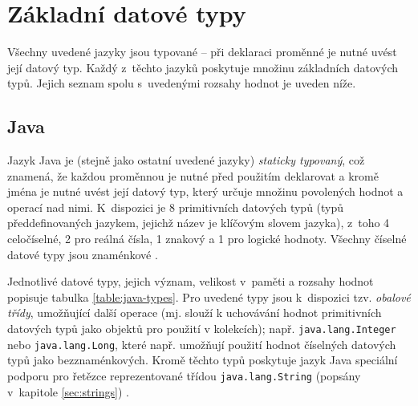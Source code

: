 \documentclass[onepage, a4paper, 12pt]{bakalarka}
\begin{document}
\section{Základní datové typy}
Všechny uvedené jazyky jsou typované -- při deklaraci proměnné je nutné uvést její datový typ. Každý z~těchto jazyků poskytuje množinu základních datových typů. Jejich seznam spolu s~uvedenými rozsahy hodnot je uveden níže.

\subsection{Java}
Jazyk Java je (stejně jako ostatní uvedené jazyky) \textit{staticky typovaný}, což znamená, že každou proměnnou je nutné před použitím deklarovat a kromě jména je nutné uvést její datový typ, který určuje množinu povolených hodnot a operací nad nimi. K~dispozici je 8 primitivních datových typů (typů předdefinovaných jazykem, jejichž název je klíčovým slovem jazyka), z~toho 4 celočíselné, 2 pro reálná čísla, 1 znakový a 1 pro logické hodnoty. Všechny číselné datové typy jsou znaménkové \cite{java-book, java-guide-types}.\par

Jednotlivé datové typy, jejich význam, velikost v~paměti a rozsahy hodnot popisuje tabulka \ref{table:java-types}. Pro uvedené typy jsou k~dispozici tzv. \textit{obalové třídy}, umožňující další operace (mj. slouží k uchovávání hodnot primitivních datových typů jako objektů pro použití v kolekcích); např. \texttt{java.lang.Integer} nebo \texttt{java.lang.Long}, které např. umožňují použití hodnot číselných datových typů jako bezznaménkových. Kromě těchto typů poskytuje jazyk Java speciální podporu pro řetězce reprezentované třídou \texttt{java.lang.String} (popsány v~kapitole \ref{sec:strings}) \cite{java-guide-types, java-guide-byte, java-guide-short, java-guide-integer, java-guide-long, java-guide-float, java-guide-double, java-guide-boolean, java-guide-character}.
\end{document}
